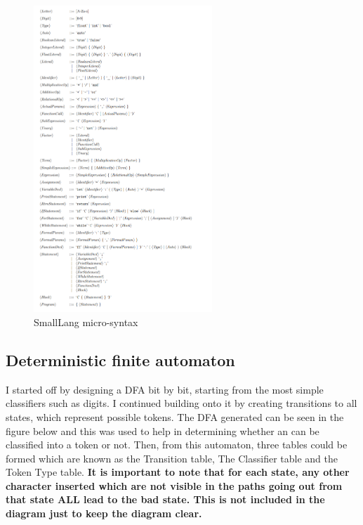 \documentclass{article}
\begin{document}
				\begin{figure}[H]
			 		\includegraphics[width=0.6\textwidth]{smalllang.png}
			 		\centering
			  		\caption{SmallLang micro-syntax}
			  		\label{fig:smalllang}
				\end{figure}
				
				\subsection{Deterministic finite automaton}
				
				I started off by designing a DFA bit by bit, starting from the most simple classifiers such as digits. I continued building onto it by creating transitions to all states, which represent possible tokens. The DFA generated can be seen in the figure below and this was used to help in determining whether an can be classified into a token or not. Then, from this automaton, three tables could be formed which are known as the Transition table, The Classifier table and the Token Type table. \textbf{It is important to note that for each state, any other character inserted which are not visible in the paths going out from that state ALL lead to the bad state. This is not included in the diagram just to keep the diagram clear.}
				
\end{document}
